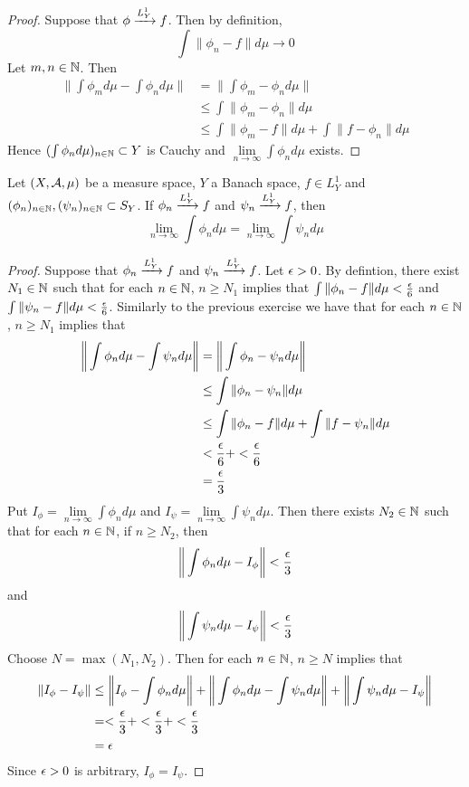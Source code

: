 \documentclass{book}
\begin{document}
	\begin{proof}
	Suppose that $\phi \xrightarrow{L^1_Y} f$. Then by definition, $$\int \|\phi_n -f\| d\mu \rightarrow 0$$ Let $m,n \in \mathbb{N}$. Then 
	\begin{align*}
	\bigg \|\int \phi_m d\mu - \int \phi_n d\mu \bigg \| 
	&= \bigg \| \int \phi_m  - \phi_n d\mu  \bigg \| \\
	& \leq  \int \|\phi_m  - \phi_n\| d \mu \\
	& \leq \int \|\phi_m  - f \| d \mu + \int \|f  - \phi_n\| d \mu
	\end{align*}
	Hence $( \int \phi_n  d \mu)_{n \in \mathbb{N}} \subset Y$ is Cauchy and $\lim\limits_{n \rightarrow \infty} \int \phi_n d\mu$ exists.
\end{proof}		

	\begin{ex}  
	Let $(X, \mathcal{A}, \mu)$ be a measure space, $Y$ a Banach space, $f \in L^1_Y$ and $(\phi_n)_{n \in \mathbb{N}}, (\psi_n)_{n \in \mathbb{N}} \subset S_Y$. If $\phi_n \xrightarrow{L^1_Y} f$ and $\psi_n \xrightarrow{L^1_Y} f$, then $$\lim\limits_{n \rightarrow \infty} \int \phi_n d\mu = \lim\limits_{n \rightarrow \infty} \int \psi_n d\mu$$
	\end{ex}
	
	\begin{proof}
	Suppose that $\phi_n \xrightarrow{L^1_Y} f$ and $\psi_n \xrightarrow{L^1_Y} f$. Let $\epsilon >0$. By defintion, there exist $N_1 \in \mathbb{N}$ such that for each $n \in \mathbb{N}$, $ n \geq N_1$ implies that $\int \|\phi_n - f\| d\mu < \frac{\epsilon}{6}$ and $\int \|\psi_n - f\| d\mu < \frac{\epsilon}{6}$. Similarly to the previous exercise we have that for each $n \in \mathbb{N}$, $n \geq N_1$ implies that
	\begin{align*}
	\bigg \| \int \phi_n d\mu  - \int \psi_n d \mu \bigg \|
	&= \bigg \| \int \phi_n - \psi_n d\mu \bigg \| \\
	& \leq \int \| \phi_n - \psi_n \| d\mu \\
	& \leq  \int \| \phi_n -f \| d \mu + \int \| f - \psi_n \| d\mu 	\\
	& <  \frac{\epsilon}{6} + < \frac{\epsilon}{6} \\
	&= \frac{\epsilon}{3}
	\end{align*}	 
Put $I_\phi = \lim\limits_{n \rightarrow \infty} \int \phi_n d\mu$ and $I_{\psi} = \lim\limits_{n \rightarrow \infty} \int \psi_n d\mu$. Then there exists $N_2 \in \mathbb{N}$ such that for each $n \in \mathbb{N}$, if $ n \geq N_2$, then $$\bigg \| \int \phi_n d\mu - I_\phi \bigg \| < \frac{\epsilon}{3}$$ and $$\bigg \| \int \psi_n d\mu - I_\psi \bigg \| < \frac{\epsilon}{3}$$ 
	Choose $N = \max(N_1, N_2)$. Then for each $n \in \mathbb{N}$, $n \geq N$ implies that
	\begin{align*}
	\|I_\phi - I_\psi\| 
	& \leq \bigg \|I_\phi - \int \phi_n d\mu \bigg \| + \bigg \| \int \phi_n d\mu - \int \psi_n d\mu \bigg \| +  \bigg \| \int \psi_n d\mu - I_\psi \bigg \| \\
	& = < \frac{\epsilon}{3} + < \frac{\epsilon}{3} + < \frac{\epsilon}{3} \\
	&= \epsilon
	\end{align*}
	Since $\epsilon >0$ is arbitrary, $I_\phi = I_\psi$.
	\end{proof}
	
\end{document}
